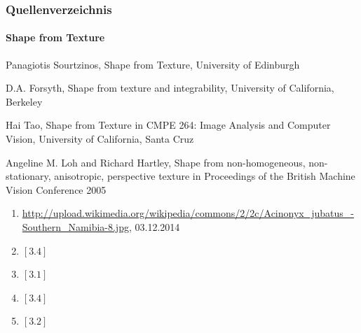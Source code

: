 \documentclass{beamer}
\begin{document}
\begin{frame}
	\frametitle{Quellenverzeichnis}
	\framesubtitle{Shape from Texture}
	
	\begin{tiny}
	\begin{enumerate}[label={[3.\arabic*]}]
	\item Panagiotis Sourtzinos, Shape from Texture, University of Edinburgh
	\item D.A. Forsyth, Shape from texture and integrability, University of California, Berkeley
	\item Hai Tao, Shape from Texture in CMPE 264: Image Analysis and Computer Vision, University of California, Santa Cruz
	\item Angeline M. Loh and Richard Hartley, Shape from non-homogeneous, non-stationary, anisotropic, perspective texture in Proceedings of the British Machine Vision Conference 2005
	\end{enumerate}
	\vspace{1em}
	\begin{enumerate}[label={Fig. 3.\arabic*}]
	\item \href{http://upload.wikimedia.org/wikipedia/commons/2/2c/Acinonyx_jubatus_-Southern_Namibia-8.jpg}{http://upload.wikimedia.org/wikipedia/commons/2/2c/Acinonyx\_jubatus\_-Southern\_Namibia-8.jpg}, 03.12.2014
	\item $\left[3.4\right]$
	\item $\left[3.1\right]$
	\item $\left[3.4\right]$
	\item $\left[3.2\right]$
	\end{enumerate}
	\end{tiny}
\end{frame}

\end{document}
